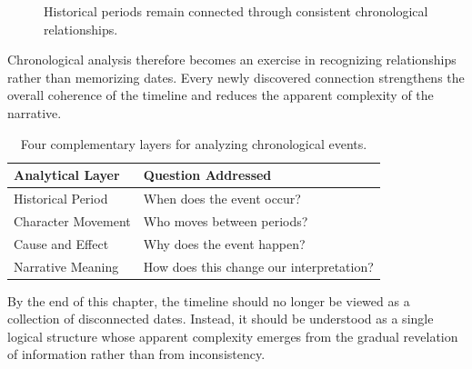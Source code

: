 \documentclass[12pt,oneside,openany]{book}
\begin{document}
\begin{figure}[H]
\centering
{}
\caption{Historical periods remain connected through consistent chronological relationships.}
\end{figure}

Chronological analysis therefore becomes an exercise in recognizing
relationships rather than memorizing dates. Every newly discovered connection
strengthens the overall coherence of the timeline and reduces the apparent
complexity of the narrative.

\begin{table}[H]
\centering
\begin{tabular}{|p{4.2cm}|p{7.8cm}|}
\hline
\textbf{Analytical Layer} & \textbf{Question Addressed}\\
\hline
Historical Period & When does the event occur?\\
\hline
Character Movement & Who moves between periods?\\
\hline
Cause and Effect & Why does the event happen?\\
\hline
Narrative Meaning & How does this change our interpretation?\\
\hline
\end{tabular}
\caption{Four complementary layers for analyzing chronological events.}
\end{table}

\begin{tcolorbox}[colback=gray!10,colframe=black,title=Final Reflection]
By the end of this chapter, the timeline should no longer be viewed as a
collection of disconnected dates. Instead, it should be understood as a single
logical structure whose apparent complexity emerges from the gradual revelation
of information rather than from inconsistency.
\end{tcolorbox}
\end{document}
